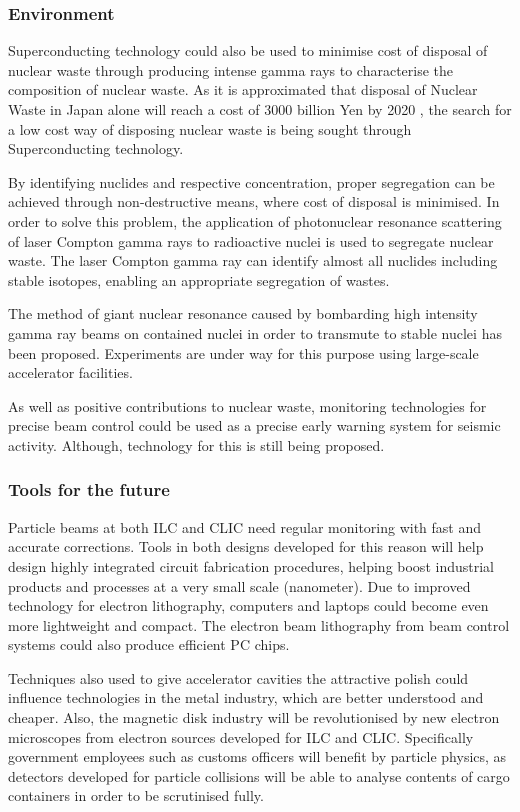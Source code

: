 \subsubsection{Environment}

Superconducting technology could also be used to minimise cost of disposal of nuclear waste through producing intense gamma rays to characterise the composition of nuclear waste. As it is approximated that disposal of Nuclear Waste in Japan alone will reach a cost of 3000 billion Yen by 2020 \cite{Numo:DisposalCost}, the search for a low cost way of disposing nuclear waste is being sought through Superconducting technology.

By identifying nuclides and respective concentration, proper segregation can be achieved through non-destructive means, where cost of disposal is minimised. In order to solve this problem, the application of photonuclear resonance scattering of laser Compton gamma rays to radioactive nuclei is used to segregate nuclear waste. The laser Compton gamma ray can identify almost all nuclides including stable isotopes, enabling an appropriate segregation of wastes.

The method of giant nuclear resonance caused by bombarding high intensity gamma ray beams on contained nuclei in order to transmute to stable nuclei has been proposed. Experiments are under way for this purpose using large-scale accelerator facilities.

As well as positive contributions to nuclear waste, monitoring technologies for precise beam control could be used as a precise early warning system for seismic activity. Although, technology for this is still being proposed. \cite{ILC:WhyNeed}

\subsubsection{Tools for the future}

Particle beams at both ILC and CLIC need regular monitoring with fast and accurate corrections. Tools in both designs developed for this reason will help design highly integrated circuit fabrication procedures, helping boost industrial products and processes at a very small scale (nanometer). Due to improved technology for electron lithography, computers and laptops could become even more lightweight and compact. The electron beam lithography from beam control systems could also produce efficient PC chips.

Techniques also used to give accelerator cavities the attractive polish could influence technologies in the metal industry, which are better understood and cheaper. Also, the magnetic disk industry will be revolutionised by new electron microscopes from electron sources developed for ILC and CLIC. Specifically government employees such as customs officers will benefit by particle physics, as detectors developed for particle collisions will be able to analyse contents of cargo containers in order to be scrutinised fully. \cite{ILC:WhyNeed}


